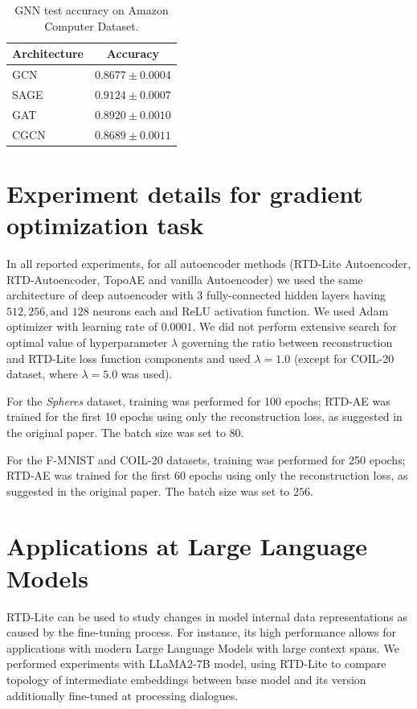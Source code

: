 \documentclass[twoside]{article}
\begin{document}
\addtolength{\tabcolsep}{-3pt}
\begin{table}
  \caption{GNN test accuracy on Amazon Computer Dataset.}
  \label{app:tbl:gnn_acc}
  \centering
  \begin{tabular}{lc}
    \toprule
    Architecture & Accuracy \\
    \midrule
    GCN & $0.8677 \pm 0.0004$\\
    SAGE & $0.9124 \pm 0.0007$\\
    GAT & $0.8920 \pm 0.0010$\\
    CGCN & $0.8689 \pm 0.0011$\\
    \bottomrule
  \end{tabular}
\end{table}
\addtolength{\tabcolsep}{2pt}

\section{Experiment details for gradient optimization task}

In all reported experiments, for all autoencoder methods (RTD-Lite Autoencoder, RTD-Autoencoder, TopoAE and vanilla Autoencoder) we used the same architecture of deep autoencoder with 3 fully-connected hidden layers having $512, 256, \text{and } 128$ neurons each and ReLU activation function. We used Adam optimizer with learning rate of $0.0001$. We did not perform  extensive search for optimal value of hyperparameter $\lambda$ governing the ratio between reconstruction and RTD-Lite loss function components and used $\lambda = 1.0$ (except for COIL-20 dataset, where $\lambda=5.0$ was used).


For the \textit{Spheres} dataset, training was performed for 100 epochs; RTD-AE was trained for the first 10 epochs using only the reconstruction loss, as suggested in the original paper. The batch size was set to $80$.

For the F-MNIST and COIL-20 datasets, training was performed for 250 epochs; RTD-AE was trained for the first 60 epochs using only the reconstruction loss, as suggested in the original paper. The batch size was set to $256$.

\section{Applications at Large Language Models}

RTD-Lite can be used to study changes in model internal data representations as caused by the fine-tuning process. For instance, its high performance allows for applications with modern Large Language Models with large context spans.
We performed experiments with LLaMA2-7B model, using RTD-Lite to compare topology of intermediate embeddings between base model and its version additionally fine-tuned at processing dialogues. 
\end{document}

